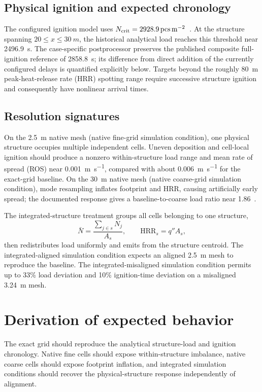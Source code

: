 \subsection{Physical ignition and expected chronology}

The configured ignition model uses
\(N_{\rm crit}=\SI{2928.9}{pcs.m^{-2}}\)~\cite{Qin2025}. At the structure
spanning \(20\le x\le\SI{30}{m}\), the historical analytical load reaches
this threshold near \SI{2496.9}{s}. The case-specific postprocessor preserves the
published composite full-ignition reference of \SI{2858.8}{s}; its difference
from direct addition of the currently configured delays is quantified
explicitly below.
Targets beyond the roughly \SI{80}{m} peak-heat-release rate (HRR) spotting range require
successive structure ignition and consequently have nonlinear arrival times.

\subsection{Resolution signatures}

On the \SI{2.5}{m} native mesh (native fine-grid simulation condition), one physical structure occupies
multiple independent cells. Uneven deposition and cell-local ignition should
produce a nonzero within-structure load range and mean rate of spread (ROS) near
\SI{0.001}{m.s^{-1}}, compared with about \SI{0.006}{m.s^{-1}} for the
exact-grid baseline.
On the \SI{30}{m} native mesh (native coarse-grid simulation condition), mode resampling inflates footprint
and HRR, causing artificially early spread; the documented response gives a
baseline-to-coarse load ratio near 1.86~\cite{Qin2025}.

The integrated-structure treatment groups all cells belonging to one structure,
\[
\bar N=\frac{\sum_{j\in s}N_j}{A_s},\qquad
\mathrm{HRR}_s=q''A_s,
\]
then redistributes load uniformly and emits from the structure centroid.
The integrated-aligned simulation condition expects an aligned \SI{2.5}{m} mesh to
reproduce the baseline. The integrated-misaligned simulation condition permits up to 33\%
load deviation and 10\% ignition-time deviation
on a misaligned \SI{3.24}{m} mesh.

\section{Derivation of expected behavior}
The exact grid should reproduce the analytical structure-load and ignition chronology. Native fine cells should expose within-structure imbalance, native coarse cells should expose footprint inflation, and integrated simulation conditions should recover the physical-structure response independently of alignment.

